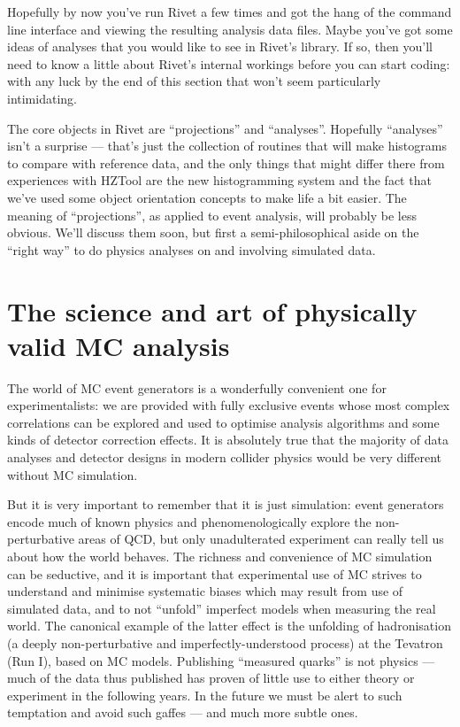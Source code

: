 Hopefully by now you've run Rivet a few times and got the hang of the command
line interface and viewing the resulting analysis data files. Maybe you've got
some ideas of analyses that you would like to see in Rivet's library. If so,
then you'll need to know a little about Rivet's internal workings before you can
start coding: with any luck by the end of this section that won't seem
particularly intimidating.

The core objects in Rivet are ``projections'' and ``analyses''. Hopefully
``analyses'' isn't a surprise --- that's just the collection of routines that
will make histograms to compare with reference data, and the only things that
might differ there from experiences with HZTool\cite{Bromley:1995np} are the new histogramming system
and the fact that we've used some object orientation concepts to make life a bit
easier. The meaning of ``projections'', as applied to event analysis, will
probably be less obvious. We'll discuss them soon, but first a
semi-philosophical aside on the ``right way'' to do physics analyses on and
involving simulated data.


\section{The science and art of physically valid MC analysis}

The world of MC event generators is a wonderfully convenient one for
experimentalists: we are provided with fully exclusive events whose most complex
correlations can be explored and used to optimise analysis algorithms and some
kinds of detector correction effects. It is absolutely true that the majority of
data analyses and detector designs in modern collider physics would be very
different without MC simulation.

But it is very important to remember that it is just simulation: event
generators encode much of known physics and phenomenologically explore the
non-perturbative areas of QCD, but only unadulterated experiment can really tell
us about how the world behaves. The richness and convenience of MC simulation
can be seductive, and it is important that experimental use of MC strives to
understand and minimise systematic biases which may result from use of simulated
data, and to not ``unfold'' imperfect models when measuring the real world. The
canonical example of the latter effect is the unfolding of hadronisation (a
deeply non-perturbative and imperfectly-understood process) at the Tevatron (Run
I), based on MC models. Publishing ``measured quarks'' is not physics --- much
of the data thus published has proven of little use to either theory or
experiment in the following years. In the future we must be alert to such
temptation and avoid such gaffes --- and much more subtle ones.

